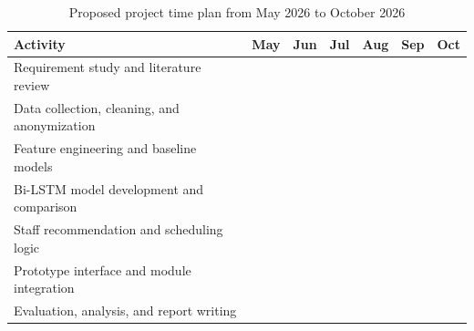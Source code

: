 \renewcommand{\arraystretch}{1.25}
\setlength{\tabcolsep}{5pt}

\begin{table}[H]
\centering
\caption{Proposed project time plan from May 2026 to October 2026}
\begin{tabular}{|p{6.2cm}|c|c|c|c|c|c|}
\hline
\textbf{Activity} & \textbf{May} & \textbf{Jun} & \textbf{Jul} & \textbf{Aug} & \textbf{Sep} & \textbf{Oct} \\
\hline
Requirement study and literature review & \cellcolor{blue!20} & \cellcolor{blue!20} &  &  &  &  \\
\hline
Data collection, cleaning, and anonymization &  & \cellcolor{blue!20} & \cellcolor{blue!20} &  &  &  \\
\hline
Feature engineering and baseline models &  &  & \cellcolor{green!20} & \cellcolor{green!20} &  &  \\
\hline
Bi-LSTM model development and comparison &  &  &  & \cellcolor{green!20} & \cellcolor{green!20} &  \\
\hline
Staff recommendation and scheduling logic &  &  &  & \cellcolor{yellow!30} & \cellcolor{yellow!30} &  \\
\hline
Prototype interface and module integration &  &  &  &  & \cellcolor{orange!30} & \cellcolor{orange!30} \\
\hline
Evaluation, analysis, and report writing &  &  &  &  & \cellcolor{red!20} & \cellcolor{red!20} \\
\hline
\end{tabular}
\end{table}
